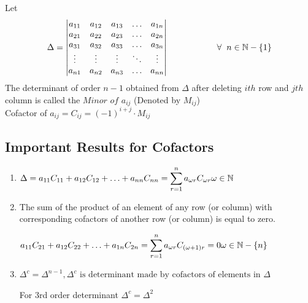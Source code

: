 \documentclass{article}
\begin{document}
Let $$\Delta = \begin{vmatrix}
    a_{11} & a_{12} & a_{13} & \ldots & a_{1n} \\
    a_{21} & a_{22} & a_{23} & \ldots & a_{2n} \\
    a_{31} & a_{32} & a_{33} & \ldots & a_{3n} \\
    \vdots & \vdots & \vdots& \ddots & \vdots \\
    a_{n1} & a_{n2} & a_{n3} & \ldots & a_{nn}
\end{vmatrix}\hspace{2cm} \forall  \hspace{2mm} n \in \mathbb{N}-\left\{1\right\}$$
The determinant of order $n-1$ obtained from $\Delta$ after deleting $ith $ row and $jth $ column is called the $\textit{Minor of $a_{ij}$}$ (Denoted by $M_{ij}$) \\

Cofactor of $a_{ij}=C_{ij}=(-1)^{i+j} \cdot M_{ij} $

\subsection{Important Results for Cofactors}
\begin{enumerate}[1.]
    \item $\Delta =a_{11}C_{11}+a_{12}C_{12}+ \ldots +a_{nn}C_{nn}=\displaystyle\sum_{r=1}^{n} a_{\omega r}C_{\omega r} \hfill \omega \in \mathbb{N}$
    \item The sum of the product of an element of any row (or column)
with corresponding cofactors of another row (or column) is
equal to zero.

$a_{11}C_{21}+a_{12}C_{22}+\ldots + a_{1n}C_{2n}= \displaystyle\sum_{r=1}^{n} a_{\omega r}C_{(\omega +1)r}=0 \hfill \omega \in \mathbb{N}-\left\{n\right\}$

\item $\Delta ^c=\Delta ^{n-1}, \Delta ^c \text{ is determinant made by cofactors of elements in $\Delta$}$

For 3rd order determinant $\Delta^c=\Delta ^2$
\end{enumerate}
\end{document}
